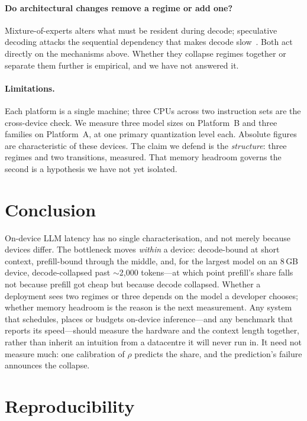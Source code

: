 \documentclass[sigconf,nonacm,10pt]{acmart}
\begin{document}
\paragraph{Do architectural changes remove a regime or add one?} Mixture-of-experts alters what must be
resident during decode; speculative decoding attacks the sequential dependency that makes decode
slow~\cite{leviathan2023speculative}. Both act directly on the mechanisms above. Whether they collapse regimes
together or separate them further is empirical, and we have not answered it.

\paragraph{Limitations.} Each platform is a single machine; three CPUs across two instruction sets are the
cross-device check. We measure three model sizes on Platform~B and three families on Platform~A, at one primary quantization
level each. Absolute figures are characteristic of these devices. The claim we defend is the \emph{structure}:
three regimes and two transitions, measured. That memory headroom governs the second is a hypothesis we
have not yet isolated.

\section{Conclusion}

On-device LLM latency has no single characterisation, and not merely because devices differ. The bottleneck
moves \emph{within} a device: decode-bound at short context, prefill-bound through the middle, and, for the largest model on an 8\,GB device,
decode-collapsed past $\sim$2{,}000 tokens---at which point prefill's share falls not because prefill got cheap but
because decode collapsed. Whether a deployment sees two regimes or three depends on the model a developer
chooses; whether memory headroom is the reason is the next measurement. Any system that schedules, places or budgets
on-device inference---and any benchmark that reports its speed---should measure the hardware and the context
length together, rather than inherit an intuition from a datacentre it will never run in. It need not measure
much: one calibration of $\rho$ predicts the share, and the prediction's failure announces the collapse.

\section*{Reproducibility}
\label{sec:repro}
\end{document}
